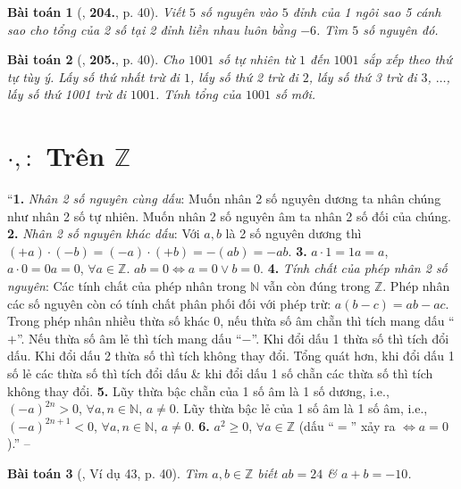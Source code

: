 \documentclass{article}
\numberwithin{equation}{section}
\newtheorem{baitoan}{Bài toán}
\begin{document}
\begin{baitoan}[\cite{Tuyen_Toan_6}, \textbf{204.}, p. 40]
	Viết $5$ số nguyên vào $5$ đỉnh của 1 ngôi sao 5 cánh sao cho tổng của 2 số tại 2 đỉnh liền nhau luôn bằng $-6$. Tìm $5$ số nguyên đó.
\end{baitoan}

\begin{baitoan}[\cite{Tuyen_Toan_6}, \textbf{205.}, p. 40]
	Cho $1001$ số tự nhiên từ $1$ đến $1001$ sắp xếp theo thứ tự tùy ý. Lấy số thứ nhất trừ đi $1$, lấy số thứ 2 trừ đi $2$, lấy số thứ 3 trừ đi $3$, $\ldots$, lấy số thứ 1001 trừ đi $1001$. Tính tổng của $1001$ số mới.
\end{baitoan}


\section{$\cdot,:$ Trên $\mathbb{Z}$}
``\textbf{1.} \textit{Nhân 2 số nguyên cùng dấu}: Muốn nhân 2 số nguyên dương ta nhân chúng như nhân 2 số tự nhiên. Muốn nhân 2 số nguyên âm ta nhân 2 số đối của chúng. \textbf{2.} \textit{Nhân 2 số nguyên khác dấu}: Với $a,b$ là 2 số nguyên dương thì $(+a)\cdot(-b) = (-a)\cdot(+b) = -(ab) = -ab$. \textbf{3.} $a\cdot1 = 1a = a$, $a\cdot0 = 0a = 0$, $\forall a\in\mathbb{Z}$. $ab = 0\Leftrightarrow a = 0\lor b = 0$. \textbf{4.} \textit{Tính chất của phép nhân 2 số nguyên}: Các tính chất của phép nhân trong $\mathbb{N}$ vẫn còn đúng trong $\mathbb{Z}$. Phép nhân các số nguyên còn có tính chất phân phối đối với phép trừ: $a(b - c) = ab - ac$. Trong phép nhân nhiều thừa số khác $0$, nếu thừa số âm chẵn thì tích mang dấu ``$+$''. Nếu thừa số âm lẻ thì tích mang dấu ``$-$''. Khi đổi dấu 1 thừa số thì tích đổi dấu. Khi đổi dấu 2 thừa số thì tích không thay đổi. Tổng quát hơn, khi đổi dấu 1 số lẻ các thừa số thì tích đổi dấu \& khi đổi dấu 1 số chẵn các thừa số thì tích không thay đổi. \textbf{5.} Lũy thừa bậc chẵn của 1 số âm là 1 số dương, i.e., $(-a)^{2n} > 0$, $\forall a,n\in\mathbb{N}$, $a\ne 0$. Lũy thừa bậc lẻ của 1 số âm là 1 số âm, i.e., $(-a)^{2n + 1} < 0$, $\forall a,n\in\mathbb{N}$, $a\ne 0$. \textbf{6.} $a^2\ge 0$, $\forall a\in\mathbb{Z}$ (dấu ``$=$'' xảy ra $\Leftrightarrow a = 0$).'' -- \cite[Chap. II, \S4, p. 40]{Tuyen_Toan_6}

\begin{baitoan}[\cite{Tuyen_Toan_6}, Ví dụ 43, p. 40]
	Tìm $a,b\in\mathbb{Z}$ biết $ab = 24$ \& $a + b = -10$.
\end{baitoan}
\end{document}
